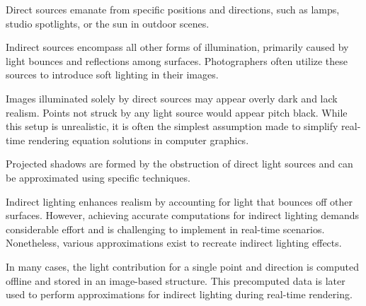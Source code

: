 Direct sources emanate from specific positions and directions, such as lamps, studio spotlights, or the sun in outdoor scenes.

Indirect sources encompass all other forms of illumination, primarily caused by light bounces and reflections among surfaces. 
Photographers often utilize these sources to introduce soft lighting in their images.

Images illuminated solely by direct sources may appear overly dark and lack realism.
Points not struck by any light source would appear pitch black. 
While this setup is unrealistic, it is often the simplest assumption made to simplify real-time rendering equation solutions in computer graphics.

Projected shadows are formed by the obstruction of direct light sources and can be approximated using specific techniques.

Indirect lighting enhances realism by accounting for light that bounces off other surfaces. 
However, achieving accurate computations for indirect lighting demands considerable effort and is challenging to implement in real-time scenarios.
Nonetheless, various approximations exist to recreate indirect lighting effects.

In many cases, the light contribution for a single point and direction is computed offline and stored in an image-based structure. 
This precomputed data is later used to perform approximations for indirect lighting during real-time rendering.
